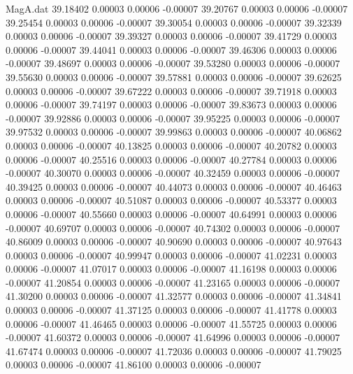 \begin{filecontents}{MagA.dat}
  39.18402    0.00003    0.00006   -0.00007
  39.20767    0.00003    0.00006   -0.00007
  39.25454    0.00003    0.00006   -0.00007
  39.30054    0.00003    0.00006   -0.00007
  39.32339    0.00003    0.00006   -0.00007
  39.39327    0.00003    0.00006   -0.00007
  39.41729    0.00003    0.00006   -0.00007
  39.44041    0.00003    0.00006   -0.00007
  39.46306    0.00003    0.00006   -0.00007
  39.48697    0.00003    0.00006   -0.00007
  39.53280    0.00003    0.00006   -0.00007
  39.55630    0.00003    0.00006   -0.00007
  39.57881    0.00003    0.00006   -0.00007
  39.62625    0.00003    0.00006   -0.00007
  39.67222    0.00003    0.00006   -0.00007
  39.71918    0.00003    0.00006   -0.00007
  39.74197    0.00003    0.00006   -0.00007
  39.83673    0.00003    0.00006   -0.00007
  39.92886    0.00003    0.00006   -0.00007
  39.95225    0.00003    0.00006   -0.00007
  39.97532    0.00003    0.00006   -0.00007
  39.99863    0.00003    0.00006   -0.00007
  40.06862    0.00003    0.00006   -0.00007
  40.13825    0.00003    0.00006   -0.00007
  40.20782    0.00003    0.00006   -0.00007
  40.25516    0.00003    0.00006   -0.00007
  40.27784    0.00003    0.00006   -0.00007
  40.30070    0.00003    0.00006   -0.00007
  40.32459    0.00003    0.00006   -0.00007
  40.39425    0.00003    0.00006   -0.00007
  40.44073    0.00003    0.00006   -0.00007
  40.46463    0.00003    0.00006   -0.00007
  40.51087    0.00003    0.00006   -0.00007
  40.53377    0.00003    0.00006   -0.00007
  40.55660    0.00003    0.00006   -0.00007
  40.64991    0.00003    0.00006   -0.00007
  40.69707    0.00003    0.00006   -0.00007
  40.74302    0.00003    0.00006   -0.00007
  40.86009    0.00003    0.00006   -0.00007
  40.90690    0.00003    0.00006   -0.00007
  40.97643    0.00003    0.00006   -0.00007
  40.99947    0.00003    0.00006   -0.00007
  41.02231    0.00003    0.00006   -0.00007
  41.07017    0.00003    0.00006   -0.00007
  41.16198    0.00003    0.00006   -0.00007
  41.20854    0.00003    0.00006   -0.00007
  41.23165    0.00003    0.00006   -0.00007
  41.30200    0.00003    0.00006   -0.00007
  41.32577    0.00003    0.00006   -0.00007
  41.34841    0.00003    0.00006   -0.00007
  41.37125    0.00003    0.00006   -0.00007
  41.41778    0.00003    0.00006   -0.00007
  41.46465    0.00003    0.00006   -0.00007
  41.55725    0.00003    0.00006   -0.00007
  41.60372    0.00003    0.00006   -0.00007
  41.64996    0.00003    0.00006   -0.00007
  41.67474    0.00003    0.00006   -0.00007
  41.72036    0.00003    0.00006   -0.00007
  41.79025    0.00003    0.00006   -0.00007
  41.86100    0.00003    0.00006   -0.00007

\end{filecontents}
